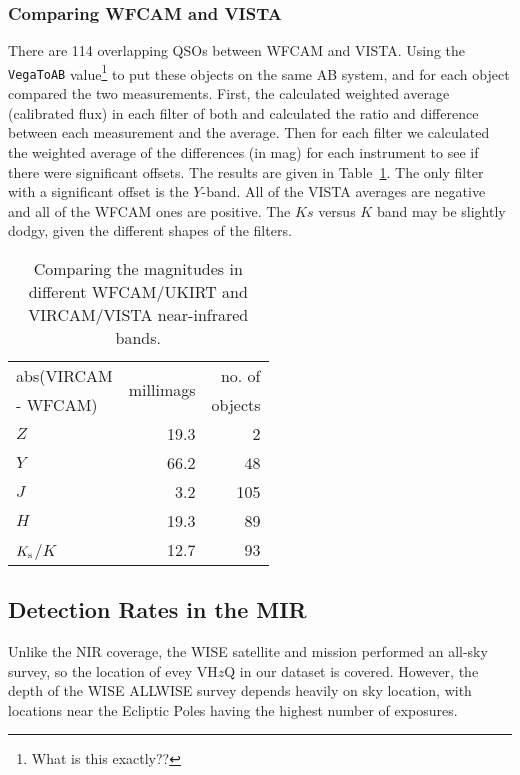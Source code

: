 \documentclass[usenatbib]{mnras}
\begin{document}
        \subsubsection{Comparing WFCAM and VISTA}
        There are 114 overlapping QSOs between WFCAM and VISTA.  Using the
        {\tt VegaToAB} value\footnote{What is this exactly??} to put these
        objects on the same AB system, and for each object compared the two
        measurements. First, the calculated weighted average (calibrated flux)
        in each filter of both and calculated the ratio and difference between
        each measurement and the average.  Then for each filter we calculated
        the weighted average of the differences (in mag) for each instrument
        to see if there were significant offsets. The results are given in
        Table~\ref{tab:WFCAM_vs_VISTA}.  The only filter with a significant
        offset is the $Y$-band. All of the VISTA averages are negative and all
        of the WFCAM ones are positive.  The $Ks$ versus $K$ band may be
        slightly dodgy, given the different shapes of the filters.
        \begin{table}
          \centering
          \begin{tabular}{l r r}
            \hline  \hline
            abs(VIRCAM & \multirow{2}{*}{millimags} &  no. of  \\
            -  WFCAM)      &                                        &  objects \\
            \hline
            $Z$                 &  19.3 	& 2 \\
            $Y$                 &  66.2 	& 48 \\
            $J$                  &    3.2 	& 105 \\
            $H$                 &  19.3     &  89 \\
            $K_{\rm s}$/$K$ &  12.7     & 93 \\
            \hline  \hline
          \end{tabular}
          \caption{Comparing the magnitudes in different WFCAM/UKIRT and VIRCAM/VISTA near-infrared bands.}
          \label{tab:WFCAM_vs_VISTA}
        \end{table}
        
    \subsection{Detection Rates in the MIR}
    Unlike the NIR coverage, the WISE
    satellite and mission performed an all-sky survey, so the location of
    evey VH$z$Q in our dataset is covered. However, the depth of the WISE
    ALLWISE survey depends heavily on sky location, with locations near
    the Ecliptic Poles having the highest number of exposures.
    
\end{document}
